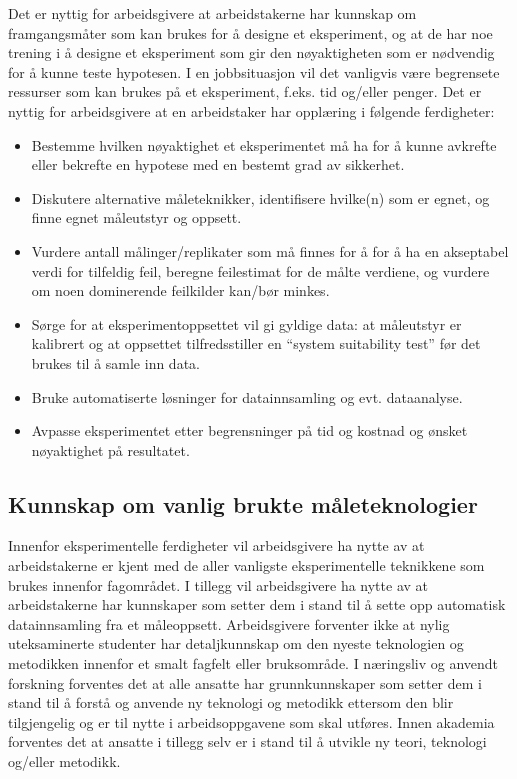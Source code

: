 \documentclass{article}
\begin{document}
Det er nyttig for arbeidsgivere at arbeidstakerne har kunnskap om framgangsmåter som kan brukes for å designe et eksperiment, og at de har noe trening i å designe et eksperiment som gir den nøyaktigheten som er nødvendig for å kunne teste hypotesen. I en jobbsituasjon vil det vanligvis være begrensete ressurser som kan brukes på et eksperiment, f.eks. tid og/eller penger.
Det er nyttig for arbeidsgivere at en arbeidstaker har opplæring i følgende ferdigheter:
\begin{itemize}
  \item Bestemme hvilken nøyaktighet et eksperimentet må ha for å kunne avkrefte eller bekrefte en hypotese med en bestemt grad av sikkerhet.
  \item Diskutere alternative måleteknikker, identifisere hvilke(n) som er egnet, og finne egnet måleutstyr og oppsett.
  \item Vurdere antall målinger/replikater som må finnes for å for å ha en akseptabel verdi for tilfeldig feil, beregne feilestimat for de målte verdiene, og vurdere om noen dominerende feilkilder kan/bør minkes.
  \item Sørge for at eksperimentoppsettet vil gi gyldige data: at måleutstyr er kalibrert og at oppsettet tilfredsstiller en ``system suitability test'' før det brukes til å samle inn data.
  \item Bruke automatiserte løsninger for datainnsamling og evt. dataanalyse.
  \item Avpasse eksperimentet etter begrensninger på tid og kostnad og ønsket nøyaktighet på resultatet.
\end{itemize}

\subsection{Kunnskap om vanlig brukte måleteknologier}
Innenfor eksperimentelle ferdigheter vil arbeidsgivere ha nytte av at arbeidstakerne er kjent med de aller vanligste eksperimentelle teknikkene som brukes innenfor fagområdet.
I tillegg vil arbeidsgivere ha nytte av at arbeidstakerne har kunnskaper som setter dem i stand til å sette opp automatisk datainnsamling fra et måleoppsett.
Arbeidsgivere forventer ikke at nylig uteksaminerte studenter har detaljkunnskap om den nyeste teknologien og metodikken innenfor et smalt fagfelt eller bruksområde.
I næringsliv og anvendt forskning forventes det at alle ansatte har grunnkunnskaper som setter dem i stand til å forstå og anvende ny teknologi og metodikk ettersom den blir tilgjengelig og er til nytte i arbeidsoppgavene som skal utføres.
Innen akademia forventes det at ansatte i tillegg selv er i stand til å utvikle ny teori, teknologi og/eller metodikk.
\end{document}
